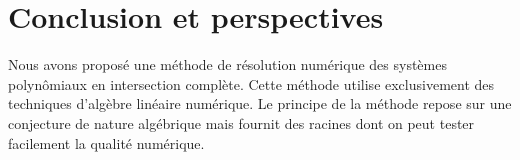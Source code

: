 \documentclass{standalone}
\begin{document}
\section{Conclusion et perspectives}
Nous avons proposé une méthode de résolution numérique des systèmes polynômiaux en intersection complète. Cette méthode utilise exclusivement des techniques d'algèbre linéaire numérique. Le principe de la méthode repose sur une conjecture de nature algébrique mais fournit des racines dont on peut tester facilement la qualité numérique.
\end{document}
